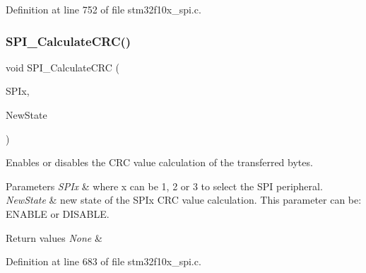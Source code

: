 Definition at line 752 of file stm32f10x\+\_\+spi.\+c.

\mbox{\label{group___s_p_i___private___functions_ga64f7276d119e6cb58afc100f8832adb0}} 
\subsubsection{\texorpdfstring{S\+P\+I\+\_\+\+Calculate\+C\+R\+C()}{SPI\_CalculateCRC()}}
{\footnotesize\ttfamily void S\+P\+I\+\_\+\+Calculate\+C\+RC (\begin{DoxyParamCaption}\item[{\hyperlink{struct_s_p_i___type_def}{S\+P\+I\+\_\+\+Type\+Def} $\ast$}]{S\+P\+Ix,  }\item[{\hyperlink{group___exported__types_gac9a7e9a35d2513ec15c3b537aaa4fba1}{Functional\+State}}]{New\+State }\end{DoxyParamCaption})}



Enables or disables the C\+RC value calculation of the transferred bytes. 


\begin{DoxyParams}{Parameters}
{\em S\+P\+Ix} & where x can be 1, 2 or 3 to select the S\+PI peripheral. \\
\hline
{\em New\+State} & new state of the S\+P\+Ix C\+RC value calculation. This parameter can be\+: E\+N\+A\+B\+LE or D\+I\+S\+A\+B\+LE. \\
\hline
\end{DoxyParams}

\begin{DoxyRetVals}{Return values}
{\em None} & \\
\hline
\end{DoxyRetVals}


Definition at line 683 of file stm32f10x\+\_\+spi.\+c.

\mbox{\label{group___s_p_i___private___functions_gaa31357879a65ee1ed7223f3b9114dcf3}} 
